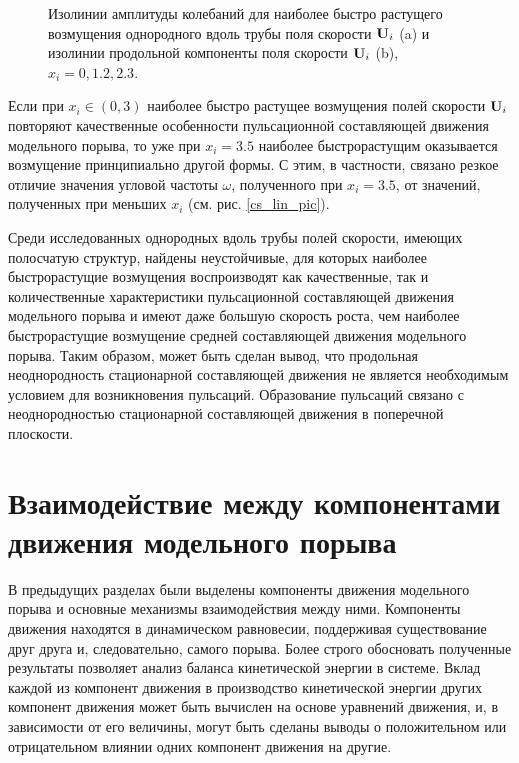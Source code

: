 \begin{figure}
\caption{Изолинии амплитуды колебаний для наиболее быстро растущего возмущения однородного вдоль трубы поля скорости $\mathbf{U}_i$ (a) и изолинии продольной компоненты поля скорости $\mathbf{U}_i$ (b), $x_i = 0, 1.2, 2.3$.}
\label{cs_lin_map_pic}
\end{figure}

Если при $x_i \in (0,3)$ наиболее быстро растущее возмущения полей скорости $\mathbf{U}_i$ повторяют качественные особенности пульсационной составляющей движения модельного порыва, то уже при $x_i = 3.5$ наиболее быстрорастущим оказывается возмущение принципиально другой формы. С этим, в частности, связано резкое отличие значения угловой частоты $\omega$, полученного при $x_i = 3.5$, от значений, полученных при меньших $x_i$ (см. рис. \ref{cs_lin_pic}). 

Среди исследованных однородных вдоль трубы полей скорости, имеющих полосчатую структур, найдены неустойчивые, для которых наиболее быстрорастущие возмущения воспроизводят как качественные, так и количественные характеристики пульсационной составляющей движения модельного порыва и имеют даже большую скорость роста, чем наиболее быстрорастущие возмущение средней составляющей движения модельного порыва. Таким образом, может быть сделан вывод, что продольная неоднородность стационарной составляющей движения не является необходимым условием для возникновения пульсаций. Образование пульсаций связано с неоднородностью стационарной составляющей движения в поперечной плоскости. 


\section{Взаимодействие между компонентами движения модельного порыва}

В предыдущих разделах были выделены компоненты движения модельного порыва и основные механизмы взаимодействия между ними. Компоненты движения находятся в динамическом равновесии, поддерживая существование друг друга и, следовательно, самого порыва. Более строго обосновать полученные результаты позволяет анализ баланса кинетической энергии в системе. Вклад каждой из компонент движения в производство кинетической энергии других компонент движения может быть вычислен на основе уравнений движения, и, в зависимости от его величины, могут быть сделаны выводы о положительном или отрицательном влиянии одних компонент движения на другие. 

